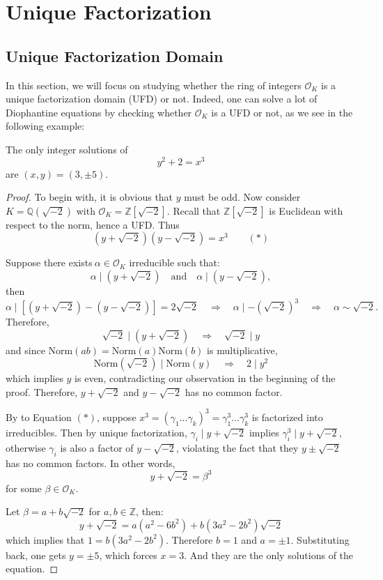\chapter{Unique Factorization}
\section{Unique Factorization Domain}
In this section, we will focus on studying whether the ring of integers $\mathcal{O}_K$ is a unique factorization domain (UFD) or not. Indeed, one can solve a lot of Diophantine equations by checking whether $\mathcal{O}_K$ is a UFD or not, as we see in the following example:

\begin{example}
The only integer solutions of
\[ y^2 + 2 = x^3 \]
are $(x,y) = (3,\pm 5)$.
\end{example}

\begin{proof}
To begin with, it is obvious that \( y \) must be odd. Now consider \( K = \mathbb{Q}(\sqrt{-2}) \) with \( \mathcal{O}_K = \mathbb{Z}[\sqrt{-2}] \). Recall that $\mathbb{Z}[\sqrt{-2}]$ is Euclidean with respect to the norm, hence a UFD. Thus
\[ (y + \sqrt{-2})(y - \sqrt{-2}) = x^3  \quad \quad (*)\]

Suppose there exists\( \ \alpha \in \mathcal{O}_K \) irreducible such that:
\[ \alpha \mid (y + \sqrt{-2}) \quad \text{and} \quad \alpha \mid (y - \sqrt{-2}), \]
then
\[ \alpha \mid [(y + \sqrt{-2}) - (y - \sqrt{-2})] = 2\sqrt{-2} \quad \Rightarrow \quad \alpha \mid -(\sqrt{-2})^3 \quad \Rightarrow \quad \alpha \sim \sqrt{-2}.\]
Therefore, 
$$\sqrt{-2} \mid (y + \sqrt{-2})  \quad \Rightarrow \quad  \sqrt{-2} \mid y $$
and since $\mathrm{Norm}(ab) = \mathrm{Norm}(a)\mathrm{Norm}(b)$ is multiplicative, 
$$\mathrm{Norm}(\sqrt{-2}) \mid \mathrm{Norm}(y)  \quad \Rightarrow \quad 2\mid y^2$$
which implies $y$ is even, contradicting our observation in the beginning of the proof. Therefore, \( y + \sqrt{-2} \) and \( y - \sqrt{-2} \) has no common factor.

\medskip
By to Equation $(*)$, suppose $x^3 = (\gamma_1\dots\gamma_k)^3 = \gamma_1^3\dots\gamma_k^3$ is factorized into irreducibles. Then by unique factorization, $\gamma_i \mid y + \sqrt{-2}$ implies $\gamma_i^3 \mid y + \sqrt{-2}$, otherwise $\gamma_i$ is also a factor of $y - \sqrt{-2}$, violating the fact that they $y \pm \sqrt{-2}$ has no common factors. In other words,
\[ y + \sqrt{-2} = \beta^3 \]
for some $\beta \in \mathcal{O}_K$.

Let \( \beta = a + b\sqrt{-2}\) for $a, b \in \mathbb{Z}$, then:
\[ y + \sqrt{-2} = a(a^2-6b^2) + b(3a^2-2b^2)\sqrt{-2} \]
which implies that $1 = b(3a^2-2b^2)$. Therefore $b=1$ and $a=\pm1$. Substituting back, one gets $y=\pm5$, which forces $x = 3$. And they are the only solutions of the equation.
\end{proof}

